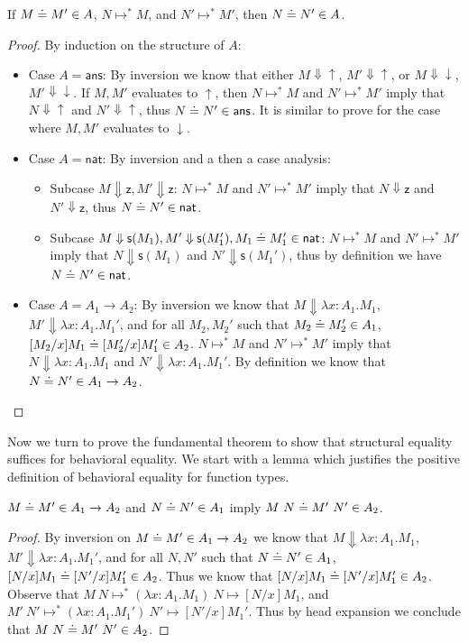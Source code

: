 \documentclass{article}
\newcommand{\eapp}[2]{#1~#2}
\newcommand{\eabs}[3]{\lambda #1:#2.#3}
\newcommand{\tans}{\mathsf{ans}}
\newcommand{\tnat}{\mathsf{nat}}
\newcommand{\eacc}{\uparrow}
\newcommand{\erej}{\downarrow}
\newcommand{\ez}{\mathsf{z}}
\newcommand{\es}[1]{\mathsf{s}(#1)}
\newcommand{\evalto}{\Downarrow}
\newcommand{\stepto}{\mapsto}
\begin{document}
\begin{lemma}
If $M \doteq M' \in A$, $N \stepto^* M$, and $N' \stepto^* M'$, then $N \doteq N' \in A$.
\end{lemma}
\begin{proof}
By induction on the structure of $A$:
\begin{itemize}
    \item Case $A = \tans$:
    By inversion we know that either $M \evalto {\eacc}$, $M' \evalto {\eacc}$, or $M \evalto {\erej}$, $M' \evalto {\erej}$.
    If $M,M'$ evaluates to $\eacc$, then $N \stepto^* M$ and $N' \stepto^* M'$ imply that $N \evalto {\eacc}$ and $N' \evalto {\eacc}$, thus $N \eeq N' \in \tans$.
    It is similar to prove for the case where $M,M'$ evaluates to $\erej$.
    \item Case $A = \tnat$:
    By inversion and a then a case analysis:
    \begin{itemize}
        \item Subcase $M \evalto \ez, M' \evalto \ez$:
        $N \stepto^* M$ and $N' \stepto^* M'$ imply that $N \evalto \ez$ and $N' \evalto \ez$, thus $N \eeq N' \in \tnat$.
        \item Subcase $M \evalto \es{M_1}, M' \evalto \es{M_1'}, M_1 \eeq M_1' \in \tnat$:
        $N \stepto^* M$ and $N' \stepto^* M'$ imply that $N \evalto \es{M_1}$ and $N' \evalto \es{M_1'}$, thus by definition we have $N \eeq N' \in \tnat$.
    \end{itemize}
    \item Case $A = A_1 \to A_2$:
    By inversion we know that $M \evalto \eabs{x}{A_1}{M_1}$, $M' \evalto \eabs{x}{A_1}{M_1'}$, and for all $M_2,M_2'$ such that $M_2 \doteq M_2' \in A_1$, $[M_2/x]M_1 \doteq [M_2'/x]M_1' \in A_2$.
    $N \stepto^* M$ and $N' \stepto^* M'$ imply that $N \evalto \eabs{x}{A_1}{M_1}$ and $N' \evalto \eabs{x}{A_1}{M_1'}$.
    By definition we know that $N \doteq N' \in A_1 \to A_2$.
\end{itemize}
\end{proof}

Now we turn to prove the fundamental theorem to show that structural equality suffices for behavioral equality.
We start with a lemma which justifies the positive definition of behavioral equality for function types.

\begin{lemma} \label{lem:negapp}
$M \doteq M' \in A_1 \to A_2$ and $N \doteq N' \in A_1$ imply $\eapp{M}{N} \eeq \eapp{M'}{N'} \in A_2$.
\end{lemma}
\begin{proof}
By inversion on $M \doteq M' \in A_1 \to A_2$ we know that $M \evalto \eabs{x}{A_1}{M_1}$, $M' \evalto \eabs{x}{A_1}{M_1'}$, and for all $N,N'$ such that $N \doteq N' \in A_1$, $[N/x]M_1 \doteq [N'/x]M_1' \in A_2$.
Thus we know that $[N/x]M_1 \doteq [N'/x]M_1' \in A_2$.
Observe that $\eapp{M}{N} \stepto^* \eapp{(\eabs{x}{A_1}{M_1})}{N} \stepto [N/x]M_1$, and $\eapp{M'}{N'} \stepto^* \eapp{(\eabs{x}{A_1}{M_1'})}{N'} \stepto [N'/x]M_1'$.
Thus by head expansion we conclude that $\eapp{M}{N} \eeq \eapp{M'}{N'} \in A_2$.
\end{proof}
\end{document}
